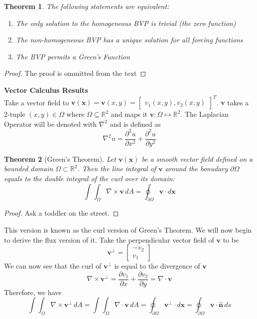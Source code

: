 \documentclass{article}
\newcommand{\R}{\mathbb{R}}
\newcommand{\pd}[2]{\frac{\partial #1}{\partial #2}}
\newcommand{\pdt}[2]{\frac{\partial ^2 #1}{\partial #2 ^2}}
\newcommand{\vb}[1]{\mathbf{ #1}}
\newcommand{\lap}{\nabla ^2}
\newcommand{\dive}[1]{\nabla \cdot \vb{#1}}
\newcommand{\curl}[1]{\nabla \times \vb{#1}}
\newcommand{\pull}{\! \! \!}
\newcommand{\un}{\mathbf{\hat{n}}}
\newtheorem{theorem}{Theorem}[section]
\numberwithin{equation}{section}
\begin{document}
\begin{theorem}
    The following statements are equivalent:
    \begin{enumerate}
        \item The only solution to the homogeneous BVP is trivial (the zero function)
        \item The non-homogeneous BVP has a unique solution for all forcing functions
        \item The BVP permits a Green's Function
    \end{enumerate}
\end{theorem}
\begin{proof}
    The proof is ommitted from the text
\end{proof}

\textbf{Vector Calculus Results} \\
Take a vector field to $\vb{v(x)}= \vb{v} (x,y) = \begin{bmatrix} v_1(x,y), v_2(x,y)  \end{bmatrix}^T$. $\vb{v}$ takes a 2-tuple $(x,y) \in \Omega$ where $\Omega \subseteq \R^2$ and maps it $\vb{v}:\Omega\mapsto\R^2$. The Laplacian Operator will be denoted with $\lap$ and is defined as
\begin{equation*}
    \lap u= \pdt{u}{x} + \pdt{u}{y}
\end{equation*}

\begin{theorem}[Green's Theorem]
    Let $\vb{v(x)}$ be a smooth vector field defined on a bounded domain $\Omega \subset\R^2$. Then the line integral of $\vb{v}$ around the bonudary $\partial \Omega$ equals to the double integral of the curl over its domain:
    \begin{equation}
        \int \pull \int_\Omega \curl{\vb{v}} \, dA = \oint_{\partial\Omega}\vb{v} \cdot d\vb{x} \label{eq:gt}
    \end{equation}  
\end{theorem}
\begin{proof}
    Ask a toddler on the street.
\end{proof}
This version is known as the curl version of Green's Theorem. We will now begin to derive the flux version of it. Take the perpendicular vector field of $\vb{v}$ to be 
\begin{equation*}
    \vb{v}^\perp = 
    \begin{bmatrix}
        -v_2 \\ v_1
    \end{bmatrix}
\end{equation*}
We can now see that the curl of $\vb{v}^\perp$ is equal to the divergence of $\vb{v}$
\begin{equation*}
    \curl{\vb{v}}^\perp = \pd{v_1}{x} + \pd{v_2}{y} = \dive{\vb{v}}
\end{equation*}
Therefore, we have 
\begin{equation}
    \int \pull \int_\Omega \curl{\vb{v^\perp}} \,dA = \int \pull\int_\Omega \dive{v} \,dA = \oint_{\partial\Omega}\vb{v}^\perp\cdot d\vb{x} = \oint_{\partial \Omega} \vb{v} \cdot \un \, ds \label{eq:gtf}
\end{equation} %
\end{document}
